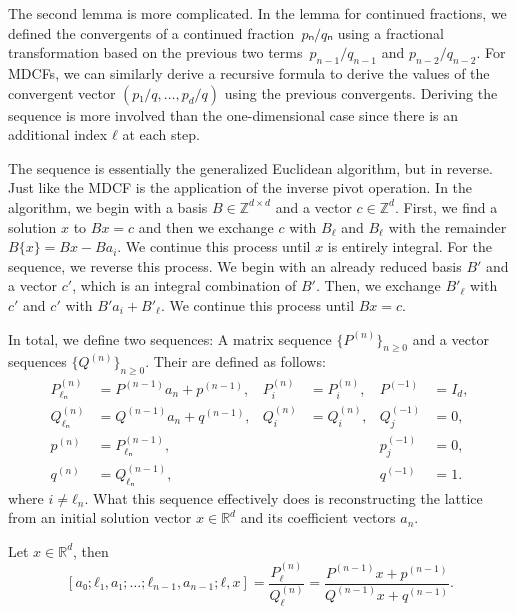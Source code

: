The second lemma is more complicated.
In the lemma for continued fractions,
we defined the convergents of a continued fraction~$pₙ/qₙ$
using a fractional transformation based on the previous two
terms~$p_{n-1}/q_{n-1}$ and $p_{n-2}/q_{n-2}$.
For MDCFs, we can similarly derive a recursive formula to derive the values of
the convergent vector $(p₁/q, \dots, p_d/q)$ using the previous convergents.
Deriving the sequence is more involved than the one-dimensional case since
there is an additional index $ℓ$ at each step.

The sequence is essentially the generalized Euclidean algorithm, but in reverse.
Just like the MDCF is the application of the inverse pivot operation.
In the algorithm, we begin with a basis $B ∈ ℤ^{d×d}$ and a vector $c ∈ ℤ^d$.
First, we find a solution $x$ to $Bx = c$ and then we exchange $c$ with $B_ℓ$
and $B_ℓ$ with the remainder $B\{x\} = Bx - Ba_i$.
We continue this process until $x$ is entirely integral.
For the sequence, we reverse this process.
We begin with an already reduced basis $B'$ and a vector $c'$, which is an
integral combination of $B'$.
Then, we exchange $B'_{ℓ}$ with $c'$ and $c'$ with $B' a_i + B'_{ℓ}$.
We continue this process until $B x = c$.

In total, we define two sequences:
A matrix sequence $\{P^{(n)}\}_{n ≥ 0}$ and a vector sequences $\{Q^{(n)}\}_{n ≥ 0}$.
Their are defined as follows:
\begin{align*}
  P_{ℓₙ}^{(n)} & = P^{(n-1)} a_n + p^{(n-1)}, & P_i^{(n)} & = P_i^{(n)}, & P^{(-1)}   & = I_d, \\
  Q_{ℓₙ}^{(n)} & = Q^{(n-1)} a_n + q^{(n-1)}, & Q_i^{(n)} & = Q_i^{(n)}, & Q^{(-1)}_j & = 0,   \\
  p^{(n)}      & = P_{ℓₙ}^{(n-1)},            &           &              & p^{(-1)}_j & = 0,   \\
  q^{(n)}      & = Q_{ℓₙ}^{(n-1)},            &           &              & q^{(-1)}   & = 1.
\end{align*}
where $i ≠ ℓ_n$.
What this sequence effectively does is reconstructing the lattice from an
initial solution vector $x ∈ ℝ^d$ and its coefficient vectors $a_n$.

\begin{lemma}[Wallis]
  \label{lem:mdcf-wallis}
  Let $x ∈ ℝ^d$, then
  \[
    [a₀; ℓ₁, a₁; …; ℓ_{n-1}, a_{n-1}; ℓ, x]
    = \frac{P_ℓ^{(n)}}{Q_ℓ^{(n)}} = \frac{P^{(n-1)} x + p^{(n-1)}}{Q^{(n-1)} x + q^{(n-1)}}.
  \]
\end{lemma}

